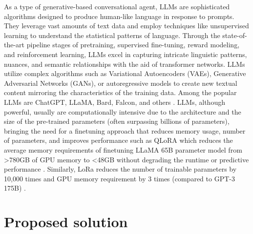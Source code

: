 \documentclass[runningheads]{llncs}
\begin{document}
As a type of generative-based conversational agent, LLMs are sophisticated algorithms designed to produce human-like language in response to prompts. They leverage vast amounts of text data and employ techniques like unsupervised learning to understand the statistical patterns of language. Through the state-of-the-art pipeline stages of pretraining, supervised fine-tuning, reward modeling, and reinforcement learning, LLMs excel in capturing intricate linguistic patterns, nuances, and semantic relationships with the aid of transformer networks. LLMs utilize complex algorithms such as Variational Autoencoders (VAEs), Generative Adversarial Networks (GANs), or autoregressive models to create new textual content mirroring the characteristics of the training data. Among the popular LLMs are ChatGPT, LLaMA, Bard, Falcon, and others \cite{Hai_LLM_2023}. LLMs, although powerful, usually are computationally intensive due to the architecture and the size of the pre-trained parameters (often surpassing billions of parameters), bringing the need for a finetuning approach that reduces memory usage, number of parameters, and improves performance such as QLoRA which reduces the average memory requirements of finetuning  LLaMA 65B parameter model from >780GB of GPU memory to <48GB without degrading the runtime or predictive performance \cite{dettmers_qlora_2023}. Similarly, LoRa reduces the number of trainable parameters by 10,000 times and GPU memory requirement by 3 times (compared to GPT-3 175B) \cite{hu_lora_2021}.

\section{Proposed solution}
\label{sec:solution}
\end{document}
